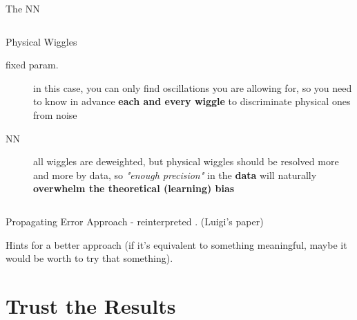 \documentclass[9pt]{beamer}
\begin{document}
\begin{frame}{The NN}
\begin{columns}
\begin{column}{0.5\textwidth}
\begin{exampleblock}{Physical Wiggles}
                \begin{description}
                    \item[fixed param.] in this case, you can only find
                        oscillations you are allowing for, so you need to know
                        in advance \textbf{each and every wiggle} to
                        discriminate physical ones from noise
                    \item[NN] all wiggles are deweighted, but physical wiggles
                        should be resolved more and more by data, so
                        \textit{"enough precision"} in the
                        \alert{\textbf{data}} will naturally
                        \textbf{\alert{overwhelm} the theoretical
                        \alert{(learning) bias}}
                \end{description}
            \end{exampleblock}
        \end{column}
    \end{columns}
\end{frame}

\begin{frame}{Propagating Error}
    \nnpdf{} Approach - reinterpreted
    . (Luigi's paper)

    Hints for a better approach (if it's equivalent to something meaningful,
    maybe it would be worth to try that something).

    
\end{frame}

\section{Trust the Results}
\end{document}
